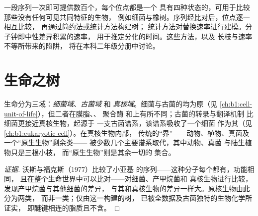 \begin{remark}[分子性状]\label{rem:b1:classifying-biodiversity:molecular}
一段序列一次即可提供数百个，每个位点都是一个
具有四种状态的，可用于比较那些没有任何可见共同特征的生物，
例如细菌与橡树。序列经比对后，位点逐一相互比较，
再通过简约法或统计方法构建树；
统计方法对替换速率进行建模。分子钟即中性差异积累的速率，
用于推定分化的时间。这些方法，以及
长枝与速率不等所带来的陷阱，
将在本科二年级分册中讨论。
\end{remark}

\section{生命之树}

\begin{proposition}[三域]\label{prop:b1:classifying-biodiversity:domains}
生命分为三域：\emph{细菌域}、\emph{古菌域} 和
\emph{真核域}。细菌与古菌的均为原（见
\cref{ch:b1:cell-unit-of-life}），但二者在膜脂、、 聚合酶
和上有所不同；古菌的转录与翻译机制
比细菌更接近真核生物，起源于
一支古菌谱系，该谱系吸收了一个细菌
作为其（见\cref{ch:b1:eukaryotic-cell}）。在真核生物内部，
传统的“界”——动物、植物、真菌及一个“原生生物”剩余类——
被少数几个主要谱系取代，其中动物、真菌
与陆生植物只是三根小枝，
而“原生生物”则是其余一切的
集合。
\end{proposition}
\begin{proof}[证据]
沃斯与福克斯（1977）比较了小亚基
  的序列——这种分子每个都有，功能相同，
且在整个生命世界中可以比对——对细菌、产甲烷菌和
真核生物进行比较，发现产甲烷菌与其他细菌的差异，
与其和真核生物的差异一样大。原核生物由此分为两类，
而非一类；仅由这一构建的树，
已被全数据及古菌独特的生物化学所证实，
即醚键相连的脂质且不含。
\end{proof}

